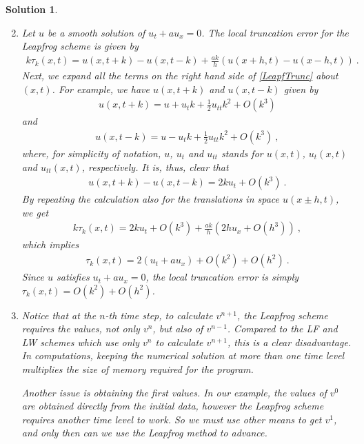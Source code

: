 \documentclass[10pt,letterpaper]{article}
\newcommand{\rb}[1]{ \left(  {#1} \right) }
\newcommand{\frb}[1]{ \left(  {#1} \right) }
\theoremstyle{break}
\newtheorem{solution}{Solution}
\begin{document}
\begin{solution}
	\begin{enumerate}\setcounter{enumii}{1}
		\item
		Let $u$ be a smooth solution of $u_t+au_x=0$. The local truncation error for the Leapfrog scheme is given by 
		\begin{gather} \label{LeapfTrunc}
			k\tau_k(x,t)=u\frb{x,t+k}-u\frb{x,t-k}+\frac{ak}{h}\rb{u\frb{x+h,t}-u\frb{x-h,t}}\ . 
		\end{gather}
		Next, we expand all the terms on the right hand side of \eqref{LeapfTrunc} about $(x,t)$. For example, we have $u\frb{x,t+k}$ and $u\frb{x,t-k}$ given by 
		\begin{gather}
			u\frb{x,t+k}=u +u_tk +\frac{1}{2}u_{tt}k^2+O\frb{k^3} 
		\end{gather}
		and
		\begin{gather}
			u\frb{x,t-k}=u -u_tk +\frac{1}{2}u_{tt}k^2+O\frb{k^3}\ , 
		\end{gather}
		where, for simplicity of notation, $u$, $u_t$ and $u_{tt}$ stands for $u(x,t)$, $u_t(x,t)$ and $u_{tt}(x,t)$, respectively. It is, thus, clear that 
		\begin{gather}
			u\frb{x,t+k}-u\frb{x,t-k}=2ku_t+O\frb{k^3}\ .
		\end{gather}
		By repeating the calculation also for the translations in space $u(x\pm h,t)$, we get 
		\begin{gather}
			k\tau_k(x,t)=2ku_t+O\frb{k^3} +\frac{ak}{h}\rb{2hu_x+O\frb{h^3}}\ , 
		\end{gather}
		which implies 
		\begin{gather}
			\tau_k(x,t)=2\rb{u_t+au_x}+O\frb{k^2}+O\frb{h^2}\ . 
		\end{gather}
		Since $u$ satisfies $u_t+au_x=0$, the local truncation error is simply $\tau_k(x,t)=O\frb{k^2}+O\frb{h^2}$. 
	
		\item
		Notice that at the $n$-th time step, to calculate $v^{n+1}$, the Leapfrog scheme requires the values, not only $v^n$, but also of $v^{n-1}$.
		Compared to the LF and LW schemes which use only $v^n$ to calculate $v^{n+1}$, this is a clear disadvantage. In computations, keeping the numerical solution at more than one time level multiplies the size of memory required for the program.
	
		Another issue is obtaining the first values. In our example, the values of $v^0$ are obtained directly from the initial data, however the Leapfrog scheme requires another time level to work.
		So we must use other means to get $v^1$, and only then can we use the Leapfrog method to advance.
	\end{enumerate}
\end{solution}
\end{document}
